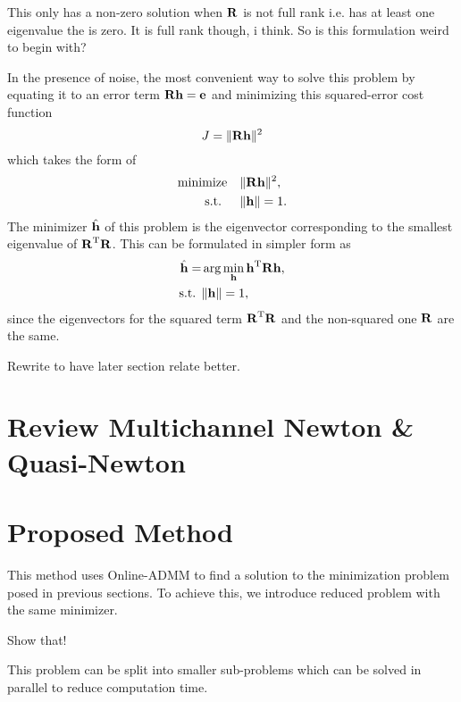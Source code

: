 \documentclass{article}
\newcommand{\h}{\mtxb{h}}
\newcommand{\R}{\mtxb{R}}
\begin{document}
\begin{note}
    This only has a non-zero solution when \(\R\) is not full rank i.e. has at least one eigenvalue the is zero. It is full rank though, i think. So is this formulation weird to begin with?
\end{note}


In the presence of noise, the most convenient way to solve this problem by equating it to an error term \(\R \h = \mtxb{e}\) and minimizing this squared-error cost function
\begin{equation}
    J = \| \R \h \|^2 \label{eq:cross_rel:cost_function}
\end{equation}
which takes the form of
\begin{align}
    \operatorname{minimize} \quad &\| \R \h \|^2, \label{eq:cross_rel:least_squares}\\
    \text{s.t. } \quad &\| \h \| = 1. \nonumber
\end{align}
The minimizer \(\hat{\h}\) of this problem is the eigenvector corresponding to the smallest eigenvalue of \(\R^\T \R\).
This can be formulated in simpler form as
\begin{align}
    \hat{\h} = &\arg \min_{\h} \h^\T \R \h, \label{eq:cross_rel:min_prob}\\
    \text{s.t. } &\| \h \| = 1, \nonumber
\end{align}
since the eigenvectors for the squared term \(\R^\T \R\) and the non-squared one \(\R\) are the same.
\begin{attention}
    Rewrite to have later section relate better.
\end{attention}

\section{Review Multichannel Newton \& Quasi-Newton}
\label{sec:review_mc_n}


\section{Proposed Method}
\label{sec:proposed_method}
This method uses Online-ADMM to find a solution to the minimization problem posed in previous sections.
To achieve this, we introduce reduced problem with the same minimizer.
\begin{attention}
    Show that!
\end{attention}
This problem can be split into smaller sub-problems which can be solved in parallel to reduce computation time.
\end{document}

